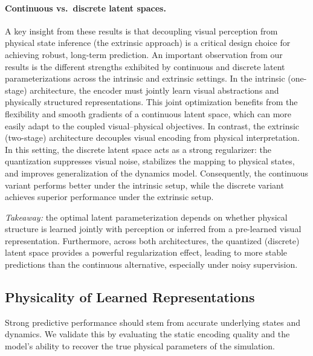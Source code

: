 \documentclass[nonacm,sigconf]{acmart}
\begin{document}
\paragraph{Continuous vs.\ discrete latent spaces.}
A key insight from these results is that {decoupling visual perception from physical state inference (the extrinsic approach) is a critical design choice for achieving robust, long-term prediction.} An important observation from our results is the different strengths exhibited by continuous and discrete latent parameterizations across the intrinsic and extrinsic settings. In the intrinsic (one-stage) architecture, the encoder must jointly learn visual abstractions and physically structured representations. This joint optimization benefits from the flexibility and smooth gradients of a continuous latent space, which can more easily adapt to the coupled visual–physical objectives. In contrast, the extrinsic (two-stage) architecture decouples visual encoding from physical interpretation. In this setting, the discrete latent space acts as a strong regularizer: the quantization suppresses visual noise, stabilizes the mapping to physical states, and improves generalization of the dynamics model. Consequently, the continuous variant performs better under the intrinsic setup, while the discrete variant achieves superior performance under the extrinsic setup. 


\textit{Takeaway:} the optimal latent parameterization depends on whether physical structure is learned jointly with perception or inferred from a pre-learned visual representation.
Furthermore, across both architectures, the quantized (discrete) latent space provides a powerful regularization effect, leading to more stable predictions than the continuous alternative, especially under noisy supervision.







 
\subsection{Physicality of Learned Representations}


Strong predictive performance should stem from accurate underlying states and dynamics. We validate this by evaluating the static encoding quality and the model's ability to recover the true physical parameters of the simulation.
\end{document}
